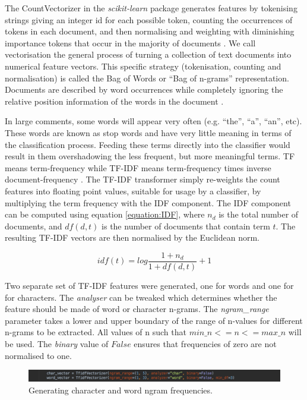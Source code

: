 The CountVectorizer in the \emph{scikit-learn} package generates features by tokenising strings giving an integer id for each possible token, counting the occurrences of tokens in each document, and then normalising and weighting with diminishing importance tokens that occur in the majority of documents \cite{scikit:tfidf}. We call vectorisation the general process of turning a collection of text documents into numerical feature vectors. This specific strategy (tokenisation, counting and normalisation) is called the Bag of Words or ``Bag of n-grams'' representation. Documents are described by word occurrences while completely ignoring the relative position information of the words in the document \cite{scikit:tfidf}.

In large comments, some words will appear very often (e.g. ``the'', ``a'', ``an'', etc). These words are known as stop words and have very little meaning in terms of the classification process. Feeding these terms directly into the classifier would result in them overshadowing the less frequent, but more meaningful terms. TF means term-frequency while TF-IDF means term-frequency times inverse document-frequency \cite{scikit:tfidf}. The TF-IDF transformer simply re-weights the count features into floating point values, suitable for usage by a classifier, by multiplying the term frequency with the IDF component. The IDF component can be computed using equation \ref{equation:IDF}, where $n_{d}$ is the total number of documents, and $df(d,t)$ is the number of documents that contain term $t$. The resulting TF-IDF vectors are then normalised by the Euclidean norm.

\begin{equation}
	idf(t) = log\frac{1 + n_{d}}{1 + df(d, t)} + 1
	\label{equation:IDF}
\end{equation}

Two separate set of TF-IDF features were generated, one for words and one for for characters. The \textit{analyser} can be tweaked which determines whether the feature should be made of word or character n-grams. The \textit{ngram\_range} parameter takes a lower and upper boundary of the range of n-values for different n-grams to be extracted. All values of n such that $min\_n <= n <= max\_n$ will be used. The \textit{binary} value of $False$ ensures that frequencies of zero are not normalised to one.

\begin{figure}[H]
	\centering
	\includegraphics[width=\textwidth]{Images/Implementation/DataProcessing/AbuseDetection/TFIDF}
	\caption{Generating character and word ngram frequencies.}
	\label{fig:AbuseDetection-TFIDF}
\end{figure}

